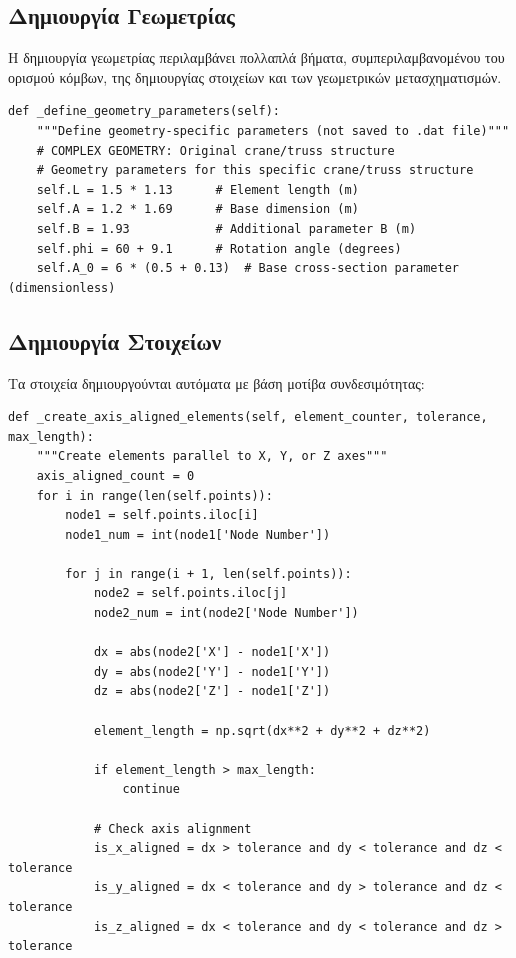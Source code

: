 \documentclass[12pt,a4paper]{article}
\begin{document}
\subsection{Δημιουργία Γεωμετρίας}

Η δημιουργία γεωμετρίας περιλαμβάνει πολλαπλά βήματα, συμπεριλαμβανομένου του ορισμού κόμβων, της δημιουργίας στοιχείων και των γεωμετρικών μετασχηματισμών.

\begin{lstlisting}[caption={Ορισμός Παραμέτρων Γεωμετρίας}]
def _define_geometry_parameters(self):
    """Define geometry-specific parameters (not saved to .dat file)"""
    # COMPLEX GEOMETRY: Original crane/truss structure
    # Geometry parameters for this specific crane/truss structure
    self.L = 1.5 * 1.13      # Element length (m)
    self.A = 1.2 * 1.69      # Base dimension (m)
    self.B = 1.93            # Additional parameter B (m)
    self.phi = 60 + 9.1      # Rotation angle (degrees)
    self.A_0 = 6 * (0.5 + 0.13)  # Base cross-section parameter (dimensionless)
\end{lstlisting}

\subsection{Δημιουργία Στοιχείων}

Τα στοιχεία δημιουργούνται αυτόματα με βάση μοτίβα συνδεσιμότητας:

\begin{lstlisting}[caption={Δημιουργία Στοιχείων Παράλληλων προς Άξονες}]
def _create_axis_aligned_elements(self, element_counter, tolerance, max_length):
    """Create elements parallel to X, Y, or Z axes"""
    axis_aligned_count = 0
    for i in range(len(self.points)):
        node1 = self.points.iloc[i]
        node1_num = int(node1['Node Number'])
        
        for j in range(i + 1, len(self.points)):
            node2 = self.points.iloc[j]
            node2_num = int(node2['Node Number'])
            
            dx = abs(node2['X'] - node1['X'])
            dy = abs(node2['Y'] - node1['Y'])
            dz = abs(node2['Z'] - node1['Z'])
            
            element_length = np.sqrt(dx**2 + dy**2 + dz**2)
            
            if element_length > max_length:
                continue
            
            # Check axis alignment
            is_x_aligned = dx > tolerance and dy < tolerance and dz < tolerance
            is_y_aligned = dx < tolerance and dy > tolerance and dz < tolerance
            is_z_aligned = dx < tolerance and dy < tolerance and dz > tolerance
\end{lstlisting}
\end{document}
